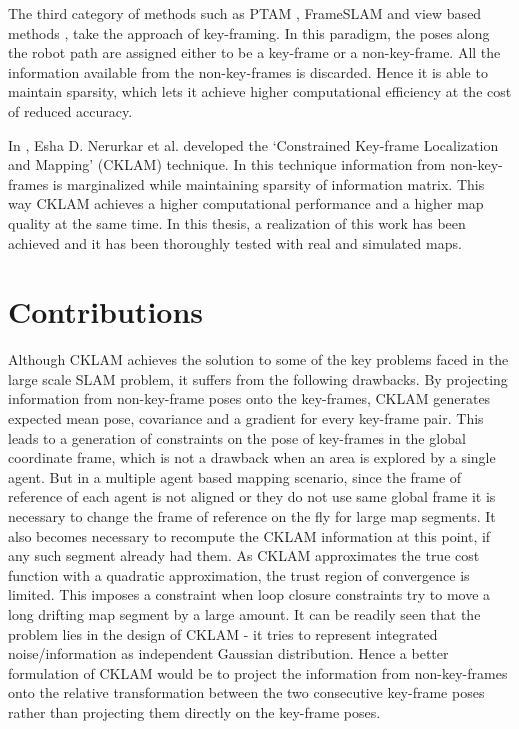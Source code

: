 The third category of methods such as PTAM \cite{klein07parallel}, FrameSLAM \cite{4648456} and view based methods \cite {Konolige01072010, 6630556}, take the approach of key-framing. In this paradigm, the poses along the robot path are assigned either to be a key-frame or a non-key-frame. All the information available from the non-key-frames is discarded. Hence it is able to maintain sparsity, which lets it achieve higher computational efficiency at the cost of reduced accuracy. 

In \cite{CKLAM}, Esha D. Nerurkar et al. developed the `Constrained Key-frame Localization and Mapping' (CKLAM) technique. In this technique information from non-key-frames is marginalized while maintaining sparsity of information matrix. This way CKLAM achieves a higher computational performance and a higher map quality at the same time. In this thesis, a realization of this work has been achieved and it has been thoroughly tested with real and simulated maps. 

\section{Contributions}
Although CKLAM achieves the solution to some of the key problems faced in the large scale SLAM problem, it suffers from the following drawbacks. By projecting information from non-key-frame poses onto the key-frames, CKLAM generates expected mean pose, covariance and a gradient for every key-frame pair. This leads to a generation of constraints on the pose of key-frames in the global coordinate frame, which is not a drawback when an area is explored by a single agent. But in a multiple agent based mapping scenario, since the frame of reference of each agent is not aligned or they do not use same global frame it is necessary to change the frame of reference on the fly for large map segments. It also becomes necessary to recompute the CKLAM information at this point, if any such segment already had them. As CKLAM approximates the true cost function with a quadratic approximation, the trust region of convergence is limited. This imposes a constraint when loop closure constraints try to move a long drifting map segment by a large amount. It can be readily seen that the problem lies in the design of CKLAM - it tries to represent integrated noise/information as independent Gaussian distribution. Hence a better formulation of CKLAM would be to project the information from non-key-frames onto the relative transformation between the two consecutive key-frame poses rather than projecting them directly on the key-frame poses. 

